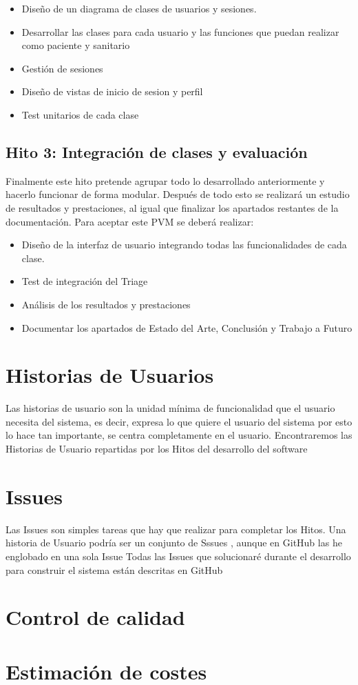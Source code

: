 \begin{itemize}
    \item{Diseño de un diagrama de clases de usuarios y sesiones.}
    \item{Desarrollar las clases para cada usuario y las funciones que puedan realizar como paciente y sanitario}
    \item{Gestión de sesiones}
    \item{Diseño de vistas de inicio de sesion y perfil}
    \item{Test unitarios de cada clase}    
\end{itemize}

\subsection*{Hito 3: Integración de clases y evaluación}

Finalmente este hito pretende agrupar todo lo desarrollado anteriormente y hacerlo funcionar de forma modular. 
Después de todo esto se realizará un estudio de resultados y prestaciones, al igual que finalizar los apartados 
restantes de la documentación. 
Para aceptar este PVM se deberá realizar: 

\begin{itemize}
    \item{Diseño de la interfaz de usuario integrando todas las funcionalidades de cada clase.}
    \item{Test de integración del Triage}
    \item{Análisis de los resultados y prestaciones}
    \item{Documentar los apartados de Estado del Arte, Conclusión y Trabajo a Futuro}
\end{itemize}

\section{Historias de Usuarios}
Las historias de usuario son la unidad mínima de funcionalidad que el usuario necesita del sistema, es decir, 
expresa lo que quiere el usuario del sistema por esto lo hace tan importante, se centra completamente en el 
usuario. Encontraremos las Historias de Usuario repartidas por los Hitos del desarrollo del software 

\section{Issues}
Las Issues son simples tareas que hay que realizar para completar los Hitos. 
Una historia de Usuario podría ser un conjunto de Sssues , aunque en GitHub las he englobado en una sola Issue
Todas las Issues que solucionaré durante el desarrollo para construir el sistema están descritas en GitHub 


\section{Control de calidad}



\section{Estimación de costes}